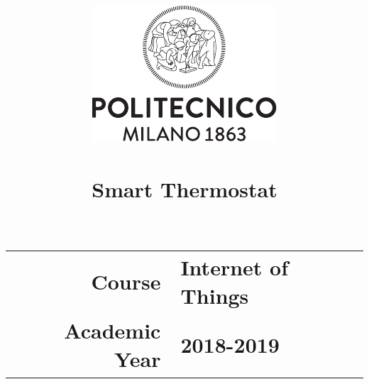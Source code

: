 \documentclass[12pt, english]{scrartcl}
\title{\normalfont \normalsize 
\includegraphics[scale=1.2]{polimi} \\[4cm]
\horrule{0.5pt} \\[0.4cm]
\huge \textbf{Smart Thermostat} \\[.5cm]
\text{Alberto Patti, Filippo Sciamanna} 
\horrule{2pt} \\[0.5cm]
\vfill
\begin{tabular}{r l}
\textbf{Course} & Internet of Things \\
\textbf{Academic Year} & 2018-2019 \\[0.5cm]
\end{tabular}
}
\begin{document}
\maketitle
\pagebreak\tableofcontents\pagebreak


\end{document}
